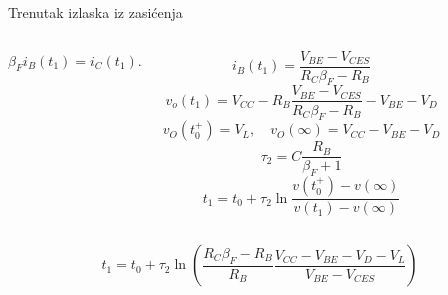 \begin{frame}[label=10-s065]{Trenutak izlaska iz zasićenja}
\setlength{\abovedisplayskip}{4pt}\setlength{\belowdisplayskip}{4pt}\setlength{\abovedisplayshortskip}{3pt}\setlength{\belowdisplayshortskip}{3pt}
\begin{columns}[T,onlytextwidth]\par\smallskip $\beta_Fi_B(t_1)=i_C(t_1)$.\centering \raggedright
\[i_B(t_1)=\frac{V_{BE}-V_{CES}}{R_C\beta_F-R_B}\]
\[v_o(t_1)=V_{CC}-R_B\frac{V_{BE}-V_{CES}}{R_C\beta_F-R_B}-V_{BE}-V_D\]
\[v_O(t_0^+)=V_L,\quad v_O(\infty)=V_{CC}-V_{BE}-V_D\]
\[\tau_2=C\frac{R_B}{\beta_F+1}\]
\[t_1=t_0+\tau_2\ln\frac{v(t_0^+)-v(\infty)}{v(t_1)-v(\infty)}\]\end{columns}\smallskip
\[t_1=t_0+\tau_2\ln\left(\frac{R_C\beta_F-R_B}{R_B}\frac{V_{CC}-V_{BE}-V_D-V_L}{V_{BE}-V_{CES}}\right)\]
\end{frame}
